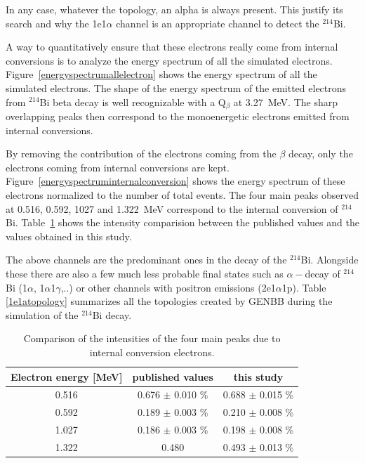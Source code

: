 \documentclass[main.tex]{subfiles}
\begin{document}
\noindent In any case, whatever the topology, an alpha is always present. This justify its search and why the 1e1$\alpha$ channel is an appropriate channel to detect the $^{\text{214}}$Bi.


\bigskip

 
\noindent A way to quantitatively ensure that these electrons really come from internal conversions is to analyze the energy spectrum of all the simulated electrons. Figure~\ref{energyspectrumallelectron} shows the energy spectrum of all the simulated electrons. The shape of the energy spectrum of the emitted electrons from $^{\text{214}}$Bi beta decay is well recognizable with a Q$_\beta$ at 3.27~MeV. The sharp overlapping peaks then correspond to the monoenergetic electrons emitted from internal conversions. 


\bigskip

\noindent By removing the contribution of the electrons coming from the $\beta$ decay, only the electrons coming from internal conversions are kept. Figure~\ref{energyspectruminternalconversion} shows the energy spectrum of these electrons normalized to the number of total events. The four main peaks observed at 0.516, 0.592, 1027 and 1.322~MeV correspond to the internal conversion of $^{\text{214}}$Bi. Table~\ref{internalconversioncomparaison} shows the intensity comparision between the published values \cite{NuclearDataSheet210} and the values obtained in this study. 


\bigskip


\noindent The above channels are the predominant ones in the decay of the $^{\text{214}}$Bi. Alongside these there are also a few much less probable final states such as $\alpha-$decay of $^{\text{214}}$Bi (1$\alpha$, 1$\alpha$1$\gamma$,..) or other channels with positron emissions (2e1$\alpha$1p). Table \ref{1e1atopology} summarizes all the topologies created by GENBB during the simulation of the $^{\text{214}}$Bi decay.


\begin{table}[h!]
\begin{center}
\begin{tabular}{c|c|c}
Electron energy [MeV]  & published values & this study \\[0.1cm]
\toprule
0.516  & 0.676 $\pm$ 0.010 \% & 0.688 $\pm$ 0.015 \% \\[0.1cm]
0.592  & 0.189 $\pm$ 0.003 \% & 0.210 $\pm$ 0.008 \% \\[0.1cm]
1.027  & 0.186 $\pm$ 0.003 \% & 0.198 $\pm$ 0.008 \% \\[0.1cm]            
1.322  & 0.480  & 0.493 $\pm$ 0.013 \% \\[0.1cm]
\bottomrule
\end{tabular}
\end{center}
\caption{Comparison of the intensities of the four main peaks due to internal conversion electrons.}
\label{internalconversioncomparaison}
\end{table}
\end{document}
